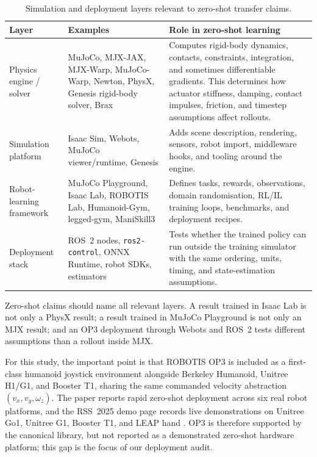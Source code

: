 \begin{table}[t]
\centering
\small
\caption{Simulation and deployment layers relevant to zero-shot transfer claims.}
\label{tab:simulation-layers}
\begin{tabularx}{\textwidth}{p{}p{}X}
\toprule
Layer & Examples & Role in zero-shot learning \\
\midrule
Physics engine / solver & MuJoCo, MJX-JAX, MJX-Warp, MuJoCo-Warp, Newton, PhysX, Genesis rigid-body solver, Brax & Computes rigid-body dynamics, contacts, constraints, integration, and sometimes differentiable gradients. This determines how actuator stiffness, damping, contact impulses, friction, and timestep assumptions affect rollouts. \\
Simulation platform & Isaac Sim, Webots, MuJoCo viewer/runtime, Genesis & Adds scene description, rendering, sensors, robot import, middleware hooks, and tooling around the engine. \\
Robot-learning framework & MuJoCo Playground, Isaac Lab, ROBOTIS Lab, Humanoid-Gym, legged-gym, ManiSkill3 & Defines tasks, rewards, observations, domain randomisation, RL/IL training loops, benchmarks, and deployment recipes. \\
Deployment stack & ROS~2 nodes, \texttt{ros2-control}, ONNX Runtime, robot SDKs, estimators & Tests whether the trained policy can run outside the training simulator with the same ordering, units, timing, and state-estimation assumptions. \\
\bottomrule
\end{tabularx}
\end{table}

Zero-shot claims should name all relevant layers. A result trained in Isaac Lab is not only a PhysX result; a result trained in MuJoCo Playground is not only an MJX result; and an OP3 deployment through Webots and ROS~2 tests different assumptions than a rollout inside MJX.

For this study, the important point is that ROBOTIS OP3 is included as a first-class humanoid joystick environment alongside Berkeley Humanoid, Unitree H1/G1, and Booster T1, sharing the same commanded velocity abstraction $(v_x, v_y, \omega_z)$. The paper reports rapid zero-shot deployment across six real robot platforms, and the RSS~2025 demo page records live demonstrations on Unitree Go1, Unitree G1, Booster T1, and LEAP hand \citep{Zakka2025-demonstrating-mujoco-playground,MuJoCoPlaygroundContributors2025-mujoco-playground-rss-2025}. OP3 is therefore supported by the canonical library, but not reported as a demonstrated zero-shot hardware platform; this gap is the focus of our deployment audit.

